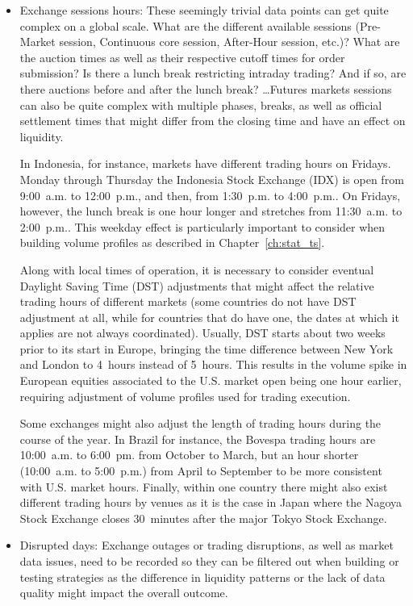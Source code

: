 \begin{itemize}
\begin{itemize}
\item Exchange sessions hours: These seemingly trivial data points can get quite complex on a global scale. What are the different available sessions (Pre-Market session, Continuous core session, After-Hour session, etc.)? What are the auction times as well as their respective cutoff times for order submission? Is there a lunch break restricting intraday trading? And if so, are there auctions before and after the lunch break? \dots Futures markets sessions can also be quite complex with multiple phases, breaks, as well as official settlement times that might differ from the closing time and have an effect on liquidity.

In Indonesia, for instance, markets have different trading hours on Fridays. Monday through Thursday the Indonesia Stock Exchange (IDX) is open from 9:00~a.m. to 12:00~p.m., and then, from 1:30~p.m. to 4:00~p.m.. On Fridays, however, the lunch break is one hour longer and stretches from 11:30~a.m. to 2:00~p.m.. This weekday effect is particularly important to consider when building volume profiles as described in Chapter~\ref{ch:stat_ts}.

Along with local times of operation, it is necessary to consider eventual Daylight Saving Time (DST) adjustments that might affect the relative trading hours of different markets (some countries do not have DST adjustment at all, while for countries that do have one, the dates at which it applies are not always coordinated). Usually, DST starts about two weeks prior to its start in Europe, bringing the time difference between New York and London to 4~hours instead of 5~hours. This results in the volume spike in European equities associated to the U.S. market open being one hour earlier, requiring adjustment of volume profiles used for trading execution.

Some exchanges might also adjust the length of trading hours during the course of the year. In Brazil for instance, the Bovespa trading hours are 10:00~a.m. to 6:00~pm. from October to March, but an hour shorter (10:00~a.m. to 5:00~p.m.) from April to September to be more consistent with U.S. market hours. Finally, within one country there might also exist different trading hours by venues as it is the case in Japan where the Nagoya Stock Exchange closes 30~minutes after the major Tokyo Stock Exchange.

\item Disrupted days: Exchange outages or trading disruptions, as well as market data issues, need to be recorded so they can be filtered out when building or testing strategies as the difference in liquidity patterns or the lack of data quality might impact the overall outcome.
\end{itemize}



\end{itemize}
